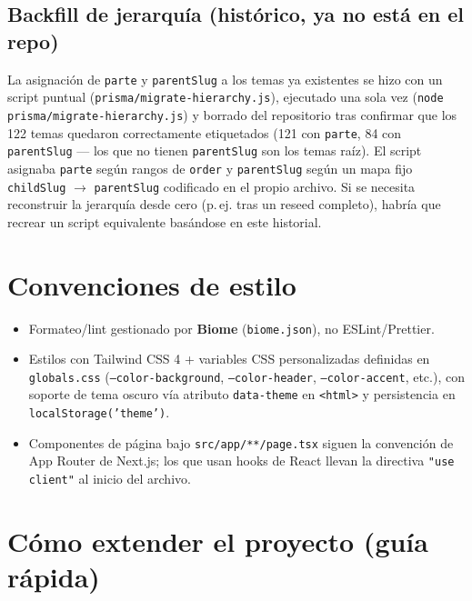 \documentclass[11pt,a4paper]{article}
\newcommand{\code}[1]{\texttt{#1}}
\begin{document}
\subsection{Backfill de jerarquía (histórico, ya no está en el repo)}

La asignación de \code{parte} y \code{parentSlug} a los temas ya existentes se hizo con un script puntual (\code{prisma/migrate-hierarchy.js}), ejecutado una sola vez (\code{node prisma/migrate-hierarchy.js}) y borrado del repositorio tras confirmar que los 122 temas quedaron correctamente etiquetados (121 con \code{parte}, 84 con \code{parentSlug} --- los que no tienen \code{parentSlug} son los temas raíz). El script asignaba \code{parte} según rangos de \code{order} y \code{parentSlug} según un mapa fijo \code{childSlug} $\rightarrow$ \code{parentSlug} codificado en el propio archivo. Si se necesita reconstruir la jerarquía desde cero (p.\,ej. tras un reseed completo), habría que recrear un script equivalente basándose en este historial.

\section{Convenciones de estilo}

\begin{itemize}
  \item Formateo/lint gestionado por \textbf{Biome} (\code{biome.json}), no ESLint/Prettier.
  \item Estilos con Tailwind CSS 4 + variables CSS personalizadas definidas en \code{globals.css} (\code{--color-background}, \code{--color-header}, \code{--color-accent}, etc.), con soporte de tema oscuro vía atributo \code{data-theme} en \code{<html>} y persistencia en \code{localStorage('theme')}.
  \item Componentes de página bajo \code{src/app/**/page.tsx} siguen la convención de App Router de Next.js; los que usan hooks de React llevan la directiva \code{"use client"} al inicio del archivo.
\end{itemize}

\section{Cómo extender el proyecto (guía rápida)}
\end{document}
